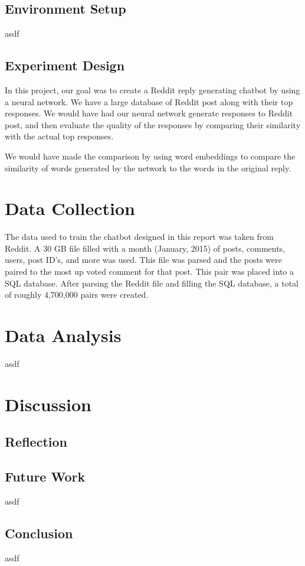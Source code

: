 \documentclass[11pt,twocolumn]{article}
\begin{document}
\subsection*{Environment Setup}
asdf
\subsection*{Experiment Design}
In this project, our goal was to create a Reddit reply generating chatbot by using a neural network.  We have a large database of Reddit post along with their top responses.  We would have had our neural network generate responses to Reddit post, and then evaluate the quality of the responses by comparing their similarity with the actual top responses.

We would have made the comparison by using word embeddings to compare the similarity of words generated by the network to the words in the original reply.
\section{Data Collection}
The data used to train the chatbot designed in this report was taken from Reddit.  A 30 GB file filled with a month (January, 2015) of posts, comments, users, post ID's, and more was used.  This file was parsed and the posts were paired to the most up voted comment for that post.  This pair was placed into a SQL database.  After parsing the Reddit file and filling the SQL database, a total of roughly 4,700,000 pairs were created.
\section{Data Analysis}
asdf
\section{Discussion}
\subsection*{Reflection}
\subsection*{Future Work}
asdf 
\subsection*{Conclusion}
asdf


\end{document}
